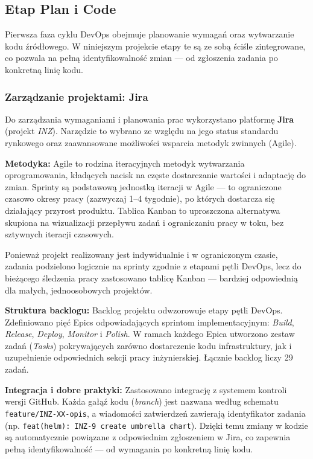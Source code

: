 \subsection{Etap Plan i Code}
Pierwsza faza cyklu DevOps obejmuje planowanie wymagań oraz wytwarzanie kodu źródłowego. W niniejszym projekcie etapy te są ze sobą ściśle zintegrowane, co pozwala na pełną identyfikowalność zmian — od zgłoszenia zadania po konkretną linię kodu.

\subsubsection{Zarządzanie projektami: Jira}
Do zarządzania wymaganiami i planowania prac wykorzystano platformę \textbf{Jira} (projekt \textit{INZ}). Narzędzie to wybrano ze względu na jego status standardu rynkowego oraz zaawansowane możliwości wsparcia metodyk zwinnych (Agile).

\textbf{Metodyka:}
Agile to rodzina iteracyjnych metodyk wytwarzania oprogramowania, kładących nacisk na częste dostarczanie wartości i adaptację do zmian. Sprinty są podstawową jednostką iteracji w Agile — to ograniczone czasowo okresy pracy (zazwyczaj 1--4 tygodnie), po których dostarcza się działający przyrost produktu. Tablica Kanban to uproszczona alternatywa skupiona na wizualizacji przepływu zadań i ograniczaniu pracy w toku, bez sztywnych iteracji czasowych.

Ponieważ projekt realizowany jest indywidualnie i w ograniczonym czasie, zadania podzielono logicznie na sprinty zgodnie z etapami pętli DevOps, lecz do bieżącego śledzenia pracy zastosowano tablicę Kanban — bardziej odpowiednią dla małych, jednoosobowych projektów.

\textbf{Struktura backlogu:}
Backlog projektu odwzorowuje etapy pętli DevOps. Zdefiniowano pięć Epics odpowiadających sprintom implementacyjnym: \textit{Build}, \textit{Release}, \textit{Deploy}, \textit{Monitor} i \textit{Polish}. W ramach każdego Epica utworzono zestaw zadań (\textit{Tasks}) pokrywających zarówno dostarczenie kodu infrastruktury, jak i uzupełnienie odpowiednich sekcji pracy inżynierskiej. Łącznie backlog liczy 29 zadań.

\textbf{Integracja i dobre praktyki:}
Zastosowano integrację z systemem kontroli wersji GitHub. Każda gałąź kodu (\textit{branch}) jest nazwana według schematu \texttt{feature/INZ-XX-opis}, a wiadomości zatwierdzeń zawierają identyfikator zadania (np. \texttt{feat(helm): INZ-9 create umbrella chart}). Dzięki temu zmiany w kodzie są automatycznie powiązane z odpowiednim zgłoszeniem w Jira, co zapewnia pełną identyfikowalność — od wymagania po konkretną linię kodu.

